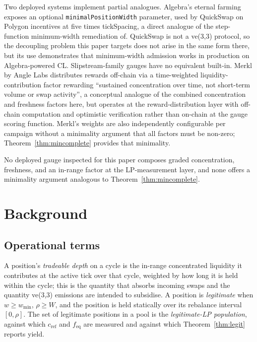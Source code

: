 \documentclass[11pt,a4paper]{article}
\theoremstyle{definition}
\theoremstyle{plain}
\theoremstyle{remark}
\begin{document}
Two deployed systems implement partial analogues. Algebra's eternal farming exposes an optional \texttt{minimalPositionWidth} parameter, used by QuickSwap on Polygon incentives at five times tickSpacing, a direct analogue of the step-function minimum-width remediation of\cite{ryan2026c}. QuickSwap is not a ve(3,3) protocol, so the decoupling problem this paper targets does not arise in the same form there, but its use demonstrates that minimum-width admission works in production on Algebra-powered CL. Slipstream-family gauges have no equivalent built-in. Merkl by Angle Labs\cite{merkl2023} distributes rewards off-chain via a time-weighted liquidity-contribution factor rewarding ``sustained concentration over time, not short-term volume or swap activity'', a conceptual analogue of the combined concentration and freshness factors here, but operates at the reward-distribution layer with off-chain computation and optimistic verification rather than on-chain at the gauge scoring function. Merkl's weights are also independently configurable per campaign without a minimality argument that all factors must be non-zero; Theorem~\ref{thm:mincomplete} provides that minimality.

No deployed gauge inspected for this paper composes graded concentration, freshness, and an in-range factor at the LP-measurement layer, and none offers a minimality argument analogous to Theorem~\ref{thm:mincomplete}.

\section{Background}\label{sec:background}

\subsection*{Operational terms}

A position's \emph{tradeable depth} on a cycle is the in-range concentrated liquidity it contributes at the active tick over that cycle, weighted by how long it is held within the cycle; this is the quantity that absorbs incoming swaps and the quantity ve(3,3) emissions are intended to subsidise. A position is \emph{legitimate} when $w \geq w_{\min}$, $\rho \geq W$, and the position is held statically over its rebalance interval $[0, \rho]$. The set of legitimate positions in a pool is the \emph{legitimate-LP population}, against which $c_{\text{ref}}$ and $f_{\text{eq}}$ are measured and against which Theorem~\ref{thm:legit} reports yield.
\end{document}
